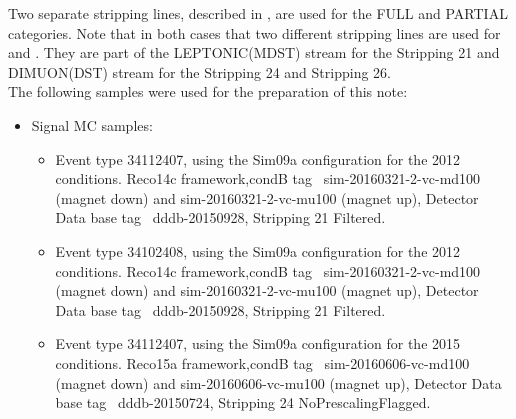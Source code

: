 Two separate stripping lines, described in , are used for the FULL and PARTIAL categories. Note that in both cases that two different stripping lines are used for \Kspizmm and \Kspipi.
They are part of the LEPTONIC(MDST) stream for the Stripping 21 and DIMUON(DST) stream for the Stripping 24 and Stripping 26. \\
The following samples were used for the preparation of this note:
\begin{itemize}
\item Signal MC samples:
\begin{itemize}
\item Event type 34112407, using the Sim09a configuration for the 2012 conditions. Reco14c framework,condB tag~\cite{condDB} sim-20160321-2-vc-md100 (magnet down) and sim-20160321-2-vc-mu100 (magnet up), Detector Data base tag~\cite{dddb} dddb-20150928, Stripping 21 Filtered. %
\item Event type 34102408, using the Sim09a configuration for the 2012 conditions. Reco14c framework,condB tag~\cite{condDB} sim-20160321-2-vc-md100 (magnet down) and sim-20160321-2-vc-mu100 (magnet up), Detector Data base tag~\cite{dddb} dddb-20150928, Stripping 21 Filtered. %
\item Event type 34112407, using the Sim09a configuration for the 2015 conditions. Reco15a framework,condB tag~\cite{condDB} sim-20160606-vc-md100 (magnet down) and sim-20160606-vc-mu100 (magnet up), Detector Data base tag~\cite{dddb} dddb-20150724, Stripping 24 NoPrescalingFlagged. %
\end{itemize}




\end{itemize}

